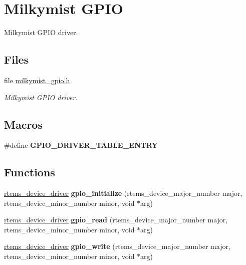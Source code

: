 \hypertarget{group__lm32__milkymist__gpio}{}\section{Milkymist G\+P\+IO}
\label{group__lm32__milkymist__gpio}


Milkymist G\+P\+IO driver.  


\subsection*{Files}
\begin{DoxyCompactItemize}
\item 
file \mbox{\hyperlink{milkymist__gpio_8h}{milkymist\+\_\+gpio.\+h}}
\begin{DoxyCompactList}\small\item\em Milkymist G\+P\+IO driver. \end{DoxyCompactList}\end{DoxyCompactItemize}
\subsection*{Macros}
\begin{DoxyCompactItemize}
\item 
\#define {\bfseries G\+P\+I\+O\+\_\+\+D\+R\+I\+V\+E\+R\+\_\+\+T\+A\+B\+L\+E\+\_\+\+E\+N\+T\+RY}
\end{DoxyCompactItemize}
\subsection*{Functions}
\begin{DoxyCompactItemize}
\item 
\mbox{\label{group__lm32__milkymist__gpio_ga9e4b1dfa27da0cca262ca22200a9a6cc}} 
\mbox{\hyperlink{group__ClassicStatus_ga545d41846817eaba6143d52ee4d9e9fe}{rtems\+\_\+device\+\_\+driver}} {\bfseries gpio\+\_\+initialize} (rtems\+\_\+device\+\_\+major\+\_\+number major, rtems\+\_\+device\+\_\+minor\+\_\+number minor, void $\ast$arg)
\item 
\mbox{\label{group__lm32__milkymist__gpio_gab4143116c9e8ae0f851d9f41667637d3}} 
\mbox{\hyperlink{group__ClassicStatus_ga545d41846817eaba6143d52ee4d9e9fe}{rtems\+\_\+device\+\_\+driver}} {\bfseries gpio\+\_\+read} (rtems\+\_\+device\+\_\+major\+\_\+number major, rtems\+\_\+device\+\_\+minor\+\_\+number minor, void $\ast$arg)
\item 
\mbox{\label{group__lm32__milkymist__gpio_gad23d79deaf491814abe9ed81426f18c3}} 
\mbox{\hyperlink{group__ClassicStatus_ga545d41846817eaba6143d52ee4d9e9fe}{rtems\+\_\+device\+\_\+driver}} {\bfseries gpio\+\_\+write} (rtems\+\_\+device\+\_\+major\+\_\+number major, rtems\+\_\+device\+\_\+minor\+\_\+number minor, void $\ast$arg)
\end{DoxyCompactItemize}


